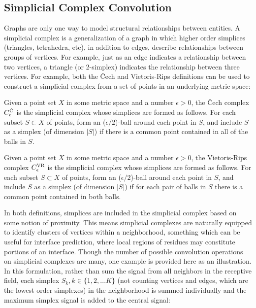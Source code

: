 \subsection{Simplicial Complex Convolution}

Graphs are only one way to model structural relationships between entities.
A simplicial complex is a generalization of a graph in which higher order simplices (triangles, tetrahedra, etc), in addition to edges, describe relationships between groups of vertices. 
For example, just as an edge indicates a relationship between two vertices, a triangle (or 2-simplex) indicates the relationship between three vertices.
For example, both the \v{C}ech and Vietoris-Rips definitions can be used to construct a simplicial complex from a set of points in an underlying metric space:

\begin{definition}
	Given a point set $X$ in some metric space and a number $\epsilon>0$, the \v{C}ech complex $C^{\textsc{\v{C}}}_\epsilon$ is the simplicial complex whose simplices are formed as follows. For each subset $S \subset X$ of points, form an ($\epsilon/2$)-ball around each point in $S$, and include $S$ as a simplex (of dimension $|S|$) if there is a common point contained in all of the balls in $S$.
\end{definition}

\begin{definition}
	Given a point set $X$ in some metric space and a number $\epsilon>0$, the Vietoris-Rips complex $C^{\textsc{VR}}_\epsilon$ is the simplicial complex whose simplices are formed as follows. For each subset $S \subset X$ of points, form an ($\epsilon/2$)-ball around each point in $S$, and include $S$ as a simplex (of dimension $|S|$) if for each pair of balls in $S$ there is a common point contained in both balls.
\end{definition}

In both definitions, simplices are included in the simplicial complex based on some notion of proximity.
This means simplicial complexes are naturally equipped to identify clusters of vertices within a neighborhood, something which can be useful for interface prediction, where local regions of residues may constitute portions of an interface.
Though the number of possible convolution operations on simplicial complexes are many, one example is provided here as an illustration. 
In this formulation, rather than sum the signal from all neighbors in the receptive field, each simplex $S_k, k \in \{1, 2,... K\}$ (not counting vertices and edges, which are the lowest order simplexes) in the neighborhood is summed individually and the maximum simplex signal is added to the central signal:

